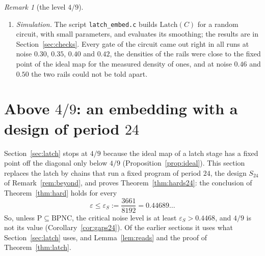 \documentclass[11pt]{amsart}
\theoremstyle{definition}
\theoremstyle{remark}
\newtheorem{remark}[theorem]{Remark}
\newcommand{\eps}{\varepsilon}
\begin{document}
\begin{remark}[the level $4/9$]
\begin{enumerate}[label=(\roman*),leftmargin=2.4em]
multiplier $\lambda$ tends to $1$ and all constants grow without bound.
\item \emph{Simulation.} The script \texttt{latch\_embed.c} builds $\mathrm{Latch}(C)$ for a random
circuit, with small parameters, and evaluates its smoothing; the results are in
Section~\ref{sec:checks}. Every gate of the circuit came out right in all runs at noise $0.30$,
$0.35$, $0.40$ and $0.42$, the densities of the rails were close to the fixed point of the ideal
map for the measured density of ones, and at noise $0.46$ and $0.50$ the two rails could not be
told apart.
\end{enumerate}
\end{remark}

\section{Above \texorpdfstring{$4/9$}{4/9}: an embedding with a design of period \texorpdfstring{$24$}{24}}\label{sec:s24}

Section~\ref{sec:latch} stops at $4/9$ because the ideal map of a latch stage has a fixed point
off the diagonal only below $4/9$ (Proposition~\ref{prop:ideal}). This section replaces the latch
by chains that run a fixed program of period $24$, the design $S_{24}$ of
Remark~\ref{rem:beyond}, and proves Theorem~\ref{thm:hards24}: the conclusion of
Theorem~\ref{thm:hard} holds for every
\[
\eps\le\eps_S:=\frac{3661}{8192}=0.44689\ldots
\]
So, unless $\mathrm P\subseteq\mathrm{BPNC}$, the critical noise level is at least $\eps_S>0.4468$, and
$4/9$ is not its value (Corollary~\ref{cor:gaps24}). Of the earlier sections it uses what
Section~\ref{sec:latch} uses, and Lemma~\ref{lem:reads} and the proof of
Theorem~\ref{thm:latch}.
\end{document}
